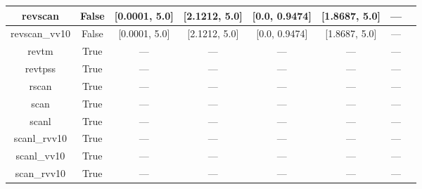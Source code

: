 \begin{tabular}{|c|c|c|c|c|c|c|l|}
      revscan &                 False &    [0.0001, 5.0] &    [2.1212, 5.0] &    [0.0, 0.9474] &  [1.8687, 5.0] &        --- &                                                              \cite{Mezei2018_2469} \\ \hline
revscan\_vv10 &                 False &    [0.0001, 5.0] &    [2.1212, 5.0] &    [0.0, 0.9474] &  [1.8687, 5.0] &        --- &                                                              \cite{Mezei2018_2469} \\ \hline
        revtm &                  True &              --- &              --- &              --- &            --- &        --- &                                                               \cite{Jana2019_6356} \\ \hline
      revtpss &                  True &              --- &              --- &              --- &            --- &        --- &                                     \cite{Perdew2009_026403,Perdew2009_026403_err} \\ \hline
        rscan &                  True &              --- &              --- &              --- &            --- &        --- &                                                           \cite{Bartok2019_161101} \\ \hline
         scan &                  True &              --- &              --- &              --- &            --- &        --- &                                                              \cite{Sun2015_036402} \\ \hline
        scanl &                  True &              --- &              --- &              --- &            --- &        --- &                            \cite{Mejia2017_052512,Mejia2018_115161,Sun2015_036402} \\ \hline
 scanl\_rvv10 &                  True &              --- &              --- &              --- &            --- &        --- &                           \cite{Mejia2017_052512,Mejia2018_115161,Peng2016_041005} \\ \hline
  scanl\_vv10 &                  True &              --- &              --- &              --- &            --- &        --- &                    \cite{Mejia2017_052512,Mejia2018_115161,Brandenburg2016_115144} \\ \hline
  scan\_rvv10 &                  True &              --- &              --- &              --- &            --- &        --- &                                                             \cite{Peng2016_041005} \\ \hline

\end{tabular}
